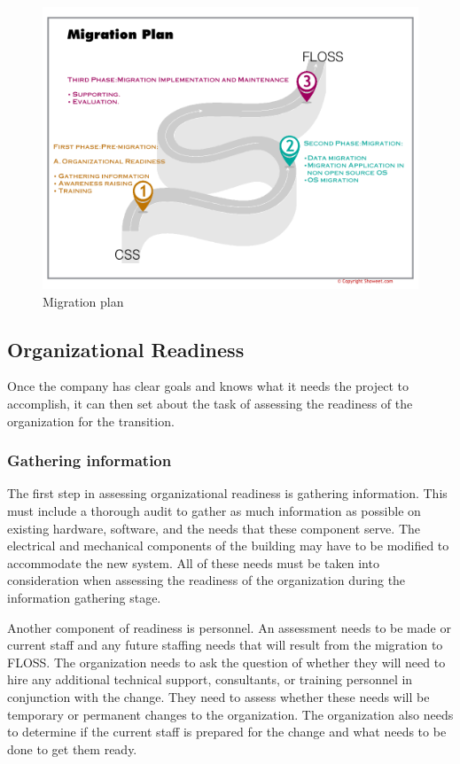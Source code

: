  \begin{figure}[H]
  \begin{center}
    \includegraphics[scale=0.6,angle=90]{img/migrationplan.png}
      \caption{Migration plan}
      \label{fig:migrationplan}
  \end{center}
    \end{figure}
    
    \subsection{Organizational Readiness}
    
    Once the company has clear goals and knows what it needs the project to accomplish, it can then set about the task of assessing the readiness of the organization for the transition.
    
    \subsubsection{Gathering information}
    The first step in assessing organizational readiness is gathering information. 
    This must include a thorough audit to gather as much information as possible on existing hardware, software, and the needs that these component serve. The electrical and mechanical components of the building may have to be modified to accommodate the new system. All of these needs must be taken into consideration when assessing the readiness of the organization during the information gathering stage.
    
    Another component of readiness is personnel. An assessment needs to be made or current staff and any future staffing needs that will result from the migration to FLOSS. The organization needs to ask the question of whether they will need to hire any additional technical support, consultants, or training personnel in conjunction with the change. They need to assess whether these needs will be temporary or permanent changes to the organization. The organization also needs to determine if the current staff is prepared for the change and what needs to be done to get them ready. 
    
